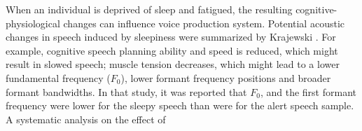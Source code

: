 When an individual is deprived of sleep and fatigued, the resulting cognitive-physiological changes can influence voice production system.
Potential acoustic changes in speech induced by sleepiness were summarized by Krajewski \etal \cite{krajewski2009acoustic}. 
For example, cognitive speech planning ability and speed is reduced, which might result in slowed speech;
muscle tension decreases, which might lead to a lower fundamental frequency ($F_0$), lower formant frequency positions and broader formant bandwidths.
In that study, it was reported that $F_0$, and the first formant frequency were lower for the sleepy speech than were for the alert speech sample.
A systematic analysis on the effect of 

\iffalse
For example, by analyzing read sentences, Greely~\etal~\cite{Greeley2007} found that certain phones in human speech show temporal and spectral variations as a function of speaker's fatigue. 
Krajewski~\etal~\cite{krajewski2009acoustic} suggested that sleepiness may have an influence on phonation and articulation of speech which affects the voice quality and speech rate.  
This study analyzed both read and spontaneous speech. 
\Soo{Could you give more details about these studies?}
\fi




